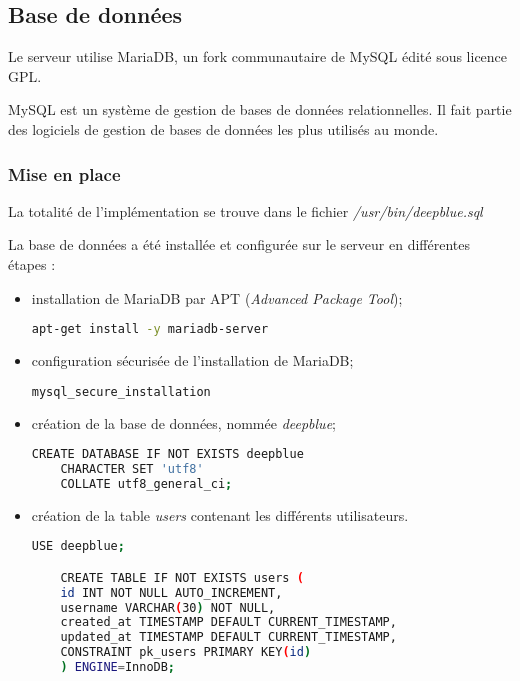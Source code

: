 \subsection{Base de données}
\label{subsec:bd}

Le serveur utilise MariaDB, un fork communautaire de MySQL édité sous licence
GPL.

MySQL est un système de gestion de bases de données relationnelles. Il fait
partie des logiciels de gestion de bases de données les plus utilisés au monde.

\subsubsection{Mise en place}
\label{subsubsec:mise-en-place}

La totalité de l'implémentation se trouve dans le fichier
\textit{/usr/bin/deepblue.sql}

La base de données a été installée et configurée sur le serveur en différentes
étapes :
\begin{itemize}
\item installation de MariaDB par APT
  (\emph{Advanced Package Tool});

  \begin{lstlisting}[language=bash]
    apt-get install -y mariadb-server
  \end{lstlisting}

\item configuration sécurisée de l'installation de MariaDB;

  \begin{lstlisting}[language=bash]
    mysql_secure_installation
  \end{lstlisting}

\item création de la base de données, nommée \emph{deepblue};

  \begin{lstlisting}[language=bash]
    CREATE DATABASE IF NOT EXISTS deepblue
    CHARACTER SET 'utf8'
    COLLATE utf8_general_ci;
  \end{lstlisting}

\item création de la table \og \textit{users} \fg contenant les
  différents utilisateurs.

  \begin{lstlisting}[language=bash]
    USE deepblue;

    CREATE TABLE IF NOT EXISTS users (
    id INT NOT NULL AUTO_INCREMENT,
    username VARCHAR(30) NOT NULL,
    created_at TIMESTAMP DEFAULT CURRENT_TIMESTAMP,
    updated_at TIMESTAMP DEFAULT CURRENT_TIMESTAMP,
    CONSTRAINT pk_users PRIMARY KEY(id)
    ) ENGINE=InnoDB;
  \end{lstlisting}
\end{itemize}

